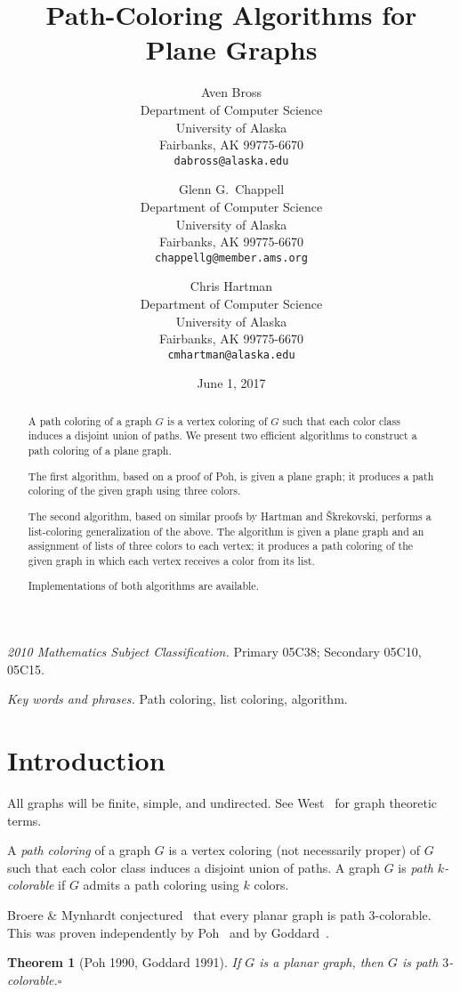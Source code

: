 \documentclass[12pt,letterpaper]{article}
\date{June 1, 2017}
\title{Path-Coloring Algorithms for Plane Graphs}
\author{Aven Bross\\
\small Department of Computer Science\\
\small University of Alaska\\
\small Fairbanks, AK 99775-6670\\
\small\texttt{dabross@alaska.edu} \and
Glenn G.~Chappell\\
\small Department of Computer Science\\
\small University of Alaska\\
\small Fairbanks, AK 99775-6670\\
\small\texttt{chappellg{@}member.ams.org} \and
Chris Hartman\\
\small Department of Computer Science\\
\small University of Alaska\\
\small Fairbanks, AK 99775-6670\\
\small\texttt{cmhartman{@}alaska.edu}}
\theoremstyle{plain}
\newtheorem{theorem}[lemma]{Theorem}         %
\theoremstyle{definition}
\theoremstyle{break}
\newcommand{\ggcqedsymbol}{$\square$}
\newcommand{\ggcqed}{\hbox{}\nobreak\hbox{\quad\ggcqedsymbol}}
\newcommand{\ggcnopf}{\ggcqed}
\newcommand{\defterm}[1]{\emph{#1}} %
\newcommand{\abstdefterm}[1]{#1} %
\begin{document}
\maketitle
\centerline{\small \textit{2010 Mathematics Subject Classification.}
 Primary 05C38; Secondary 05C10, 05C15.}
\centerline{\small \textit{Key words and phrases.}
 Path coloring, list coloring, algorithm.}

\begin{abstract}
A \abstdefterm{path coloring} of a graph $G$ is a vertex coloring
of $G$ such that each color class induces a disjoint union of paths.
We present two efficient algorithms
to construct a path coloring of a plane graph.

The first algorithm, based on a proof of Poh, %
is given a plane graph;
it produces a path coloring of the given graph
using three colors.

The second algorithm,
based on similar proofs
by Hartman %
and \v{S}krekovski, %
performs a list-coloring generalization of the above.
The algorithm is given a plane graph and an assignment of lists of
three colors to each vertex;
it produces a path coloring of the given graph
in which each vertex receives a color from its list.

Implementations of both algorithms are available.
\end{abstract}


\section{Introduction}

All graphs will be finite, simple, and undirected.
See West~\cite{Wes2000} for graph theoretic terms.

A \defterm{path coloring} of a graph $G$ is a vertex coloring
(not necessarily proper) of $G$ such that each color class induces
a disjoint union of paths.
A graph $G$ is \defterm{path $k$-colorable} if $G$
admits a path coloring using $k$ colors.

Broere \& Mynhardt conjectured~\cite[Conj.~16]{BrMy1985}
that every planar graph is path $3$-colorable.
This was proven independently by Poh~\cite[Thm.~2]{Poh1990}
and by Goddard~\cite[Thm.~1]{God1991}.

\begin{theorem}[Poh 1990, Goddard 1991] \label{T:planar3c}
If $G$ is a planar graph,
then $G$ is path $3$-colorable.\ggcnopf\end{theorem}
\end{document}
